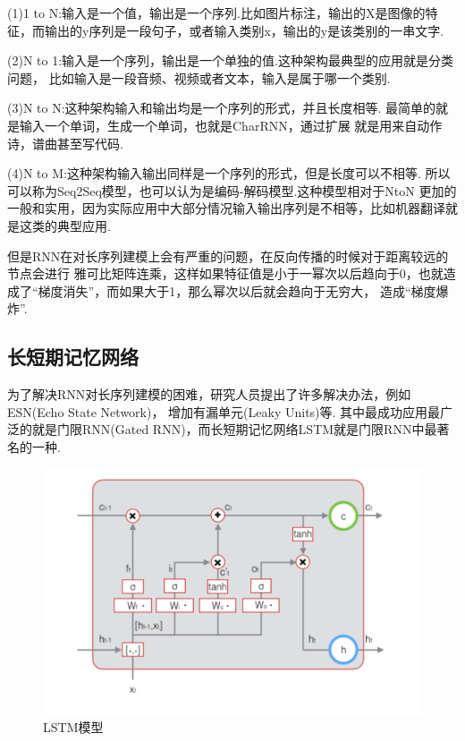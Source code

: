 \documentclass[bachelor,adobefonts]{jnuthesis}
\begin{document}


(1)1 to N:输入是一个值，输出是一个序列.比如图片标注，输出的X是图像的特征，而输出的y序列是一段句子，或者输入类别x，输出的y是该类别的一串文字.

(2)N to 1:输入是一个序列，输出是一个单独的值.这种架构最典型的应用就是分类问题，
比如输入是一段音频、视频或者文本，输入是属于哪一个类别.


(3)N to N:这种架构输入和输出均是一个序列的形式，并且长度相等.
最简单的就是输入一个单词，生成一个单词，也就是CharRNN，通过扩展
就是用来自动作诗，谱曲甚至写代码.

(4)N to M:这种架构输入输出同样是一个序列的形式，但是长度可以不相等.
所以可以称为Seq2Seq模型，也可以认为是编码-解码模型.这种模型相对于NtoN
更加的一般和实用，因为实际应用中大部分情况输入输出序列是不相等，比如机器翻译就是这类的典型应用.

但是RNN在对长序列建模上会有严重的问题，在反向传播的时候对于距离较远的节点会进行
雅可比矩阵连乘，这样如果特征值是小于一幂次以后趋向于0，也就造成了“梯度消失”，而如果大于1，那么幂次以后就会趋向于无穷大，
造成“梯度爆炸”.

\subsection{长短期记忆网络}
为了解决RNN对长序列建模的困难，研究人员提出了许多解决办法，例如ESN(Echo State Network)，
增加有漏单元(Leaky Units)等.
其中最成功应用最广泛的就是门限RNN(Gated RNN)，而长短期记忆网络LSTM就是门限RNN中最著名的一种.

\begin{figure}[h!]
  \centering
  \includegraphics[width=0.6\linewidth]{LSTM.png}
  \caption{LSTM模型}
\end{figure}
\end{document}
